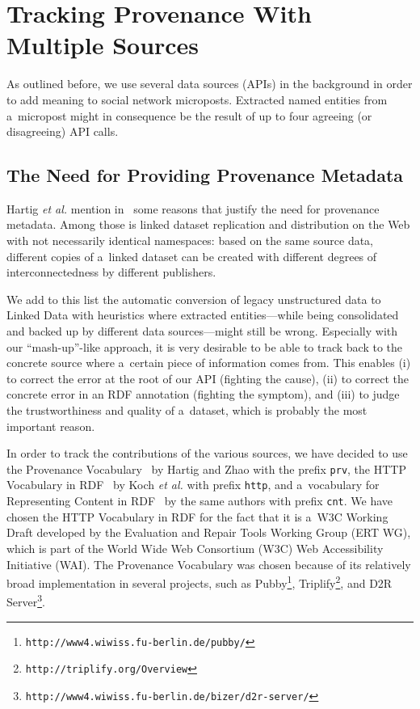 \section{Tracking Provenance With Multiple Sources}                    \label{sec:tracking}
As outlined before, we use several data sources (APIs) in the background in order to add meaning to social network microposts. Extracted named entities from a~micropost might in consequence be the result of up to four agreeing (or disagreeing) API calls. 

\subsection{The Need for Providing Provenance Metadata}
Hartig \emph{et al.} mention in~\cite{ipaw10:olaf} some reasons that justify the need for provenance metadata. Among those is linked dataset replication and distribution on the Web with not necessarily identical namespaces: based on the same source data, different copies of a~linked dataset can be created with different degrees of interconnectedness by different publishers.

We add to this list the automatic conversion of legacy unstructured data to Linked Data with heuristics where extracted entities---while being consolidated and backed up by different data sources---might still be wrong. Especially with our ``mash-up''-like approach, it is very desirable to be able to track back to the concrete source where a~certain piece of information comes from. This enables (i) to correct the error at the root of our API (fighting the cause), (ii) to correct the concrete error in an RDF annotation (fighting the symptom), and (iii) to judge the trustworthiness and quality of a~dataset, which is probably the most important reason.

In order to track the contributions of the various sources, we have decided to use the Provenance Vocabulary~\cite{Hartig:Provenance} by Hartig and Zhao with the prefix \texttt{prv}, the HTTP Vocabulary in RDF~\cite{HTTP:RDF} by Koch \emph{et al.} with prefix \texttt{http}, and a~vocabulary for Representing Content in RDF~\cite{CNT:RDF} by the same authors with prefix \texttt{cnt}. We have chosen the HTTP Vocabulary in RDF for the fact that it is a~W3C Working Draft  developed by the Evaluation and Repair Tools Working Group (ERT WG), which is part of the World Wide Web Consortium (W3C) Web Accessibility Initiative (WAI). The Provenance Vocabulary was chosen because of its relatively broad implementation in several projects, such as Pubby\footnote{\texttt{http://www4.wiwiss.fu-berlin.de/pubby/}}, Triplify\footnote{\texttt{http://triplify.org/Overview}}, and D2R Server\footnote{\texttt{http://www4.wiwiss.fu-berlin.de/bizer/d2r-server/}}.


